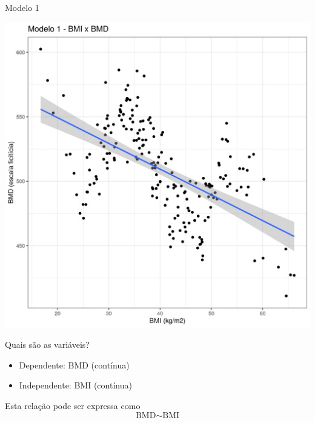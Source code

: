 \documentclass{beamer}
\begin{document}
\begin{frame}{\scriptsize Modelo 1}
  \begin{center}
    \includegraphics[height=.9\textheight]{Cap31-32/pratica-rlm1}
  \end{center}
\end{frame}

\begin{frame}{\scriptsize Quais são as variáveis?}
  \begin{itemize}
    \footnotesize
  \item Dependente: BMD (contínua)
  \item Independente: BMI (contínua)
  \end{itemize}
  \vfill
  \begin{block}{Esta relação pode ser expressa como}
    \footnotesize
    \begin{displaymath}
      \text{BMD} \sim \text{BMI}
    \end{displaymath}
  \end{block}
\end{frame}
\end{document}
